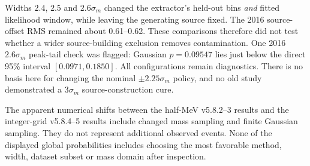 Widths $2.4$, $2.5$ and $2.6\sigma_m$ changed the extractor's held-out bins \emph{and} fitted likelihood window, while leaving the generating source fixed. The 2016 source-offset RMS remained about 0.61--0.62. These comparisons therefore did not test whether a wider source-building exclusion removes contamination. One 2016 $2.6\sigma_m$ peak-tail check was flagged: Gaussian $p=0.09547$ lies just below the direct 95\% interval $[0.0971,0.1850]$. All configurations remain diagnostics. There is no basis here for changing the nominal $\pm2.25\sigma_m$ policy, and no old study demonstrated a $3\sigma_m$ source-construction cure.

The apparent numerical shifts between the half-MeV v5.8.2--3 results and the integer-grid v5.8.4--5 results include changed mass sampling and finite Gaussian sampling. They do not represent additional observed events. None of the displayed global probabilities includes choosing the most favorable method, width, dataset subset or mass domain after inspection.
